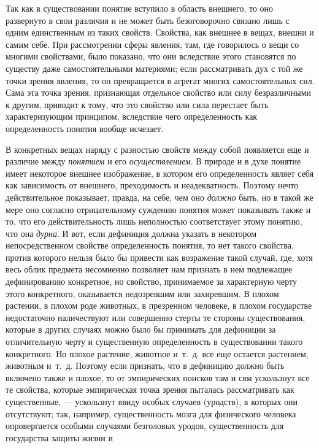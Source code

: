 \documentclass[twoside]{article}
\begin{document}
Так как в существовании понятие вступило в область внешнего,
то оно развернуто в свои различия и не может быть безоговорочно связано
лишь с одним единственным из таких свойств. Свойства, как внешнее в вещах,
внешни и самим себе. При рассмотрении сферы явления, там, где говорилось о
вещи со многими свойствами, было показано, что они вследствие этого
становятся по существу даже самостоятельными материями; если рассматривать
дух с той же точки зрения явления, то он превращается в агрегат многих
самостоятельных сил. Сама эта точка зрения, признающая отдельное свойство
или силу безразличными к другим, приводит к тому, что это свойство или сила
перестает быть характеризующим принципом, вследствие чего определенность
как определенность понятия вообще исчезает.

В конкретных вещах наряду с разностью свойств между собой
появляется еще и различие между
{\em понятием} и его
{\em осуществлением}. В
природе и в духе понятие имеет некоторое внешнее изображение, в котором его
определенность являет себя как зависимость от внешнего, преходимость и
неадекватность. Поэтому нечто действительное показывает, правда, на себе,
чем оно {\em должно}
быть, но в такой же мере оно согласно отрицательному суждению
понятия может показывать также и то, что его действительность лишь
неполностью соответствует этому понятию, что она
{\em дурна}. И вот, если
дефиниция должна указать в некотором непосредственном свойстве
определенность понятия, то нет такого свойства, против которого нельзя было
бы привести как возражение такой случай, где, хотя весь облик предмета
несомненно позволяет нам признать в нем подлежащее
дефинированию конкретное, но свойство, принимаемое за характерную черту
этого конкретного, оказывается недозревшим или захиревшим. В плохом
растении, в плохом роде животных, в презренном человеке, в плохом
государстве недостаточно наличествуют или совершенно стерты те стороны
существования, которые в других случаях можно было бы принимать для
дефиниции за отличительную черту и существенную определенность в
существовании такого конкретного. Но плохое растение, животное и~т.~д. все
еще остается растением, животным и~т.~д. Поэтому если признать, что в
дефиницию должно быть включено также и плохое, то от эмпирических поисков
там и сям ускользнут все те свойства, которые эмпирическая точка зрения
пыталась рассматривать как существенные, — ускользнут ввиду
особых случаев (уродств), в которых они отсутствуют; так, например,
существенность мозга для физического человека опровергается особыми
случаями безголовых уродов, существенность для государства защиты жизни и
\end{document}
